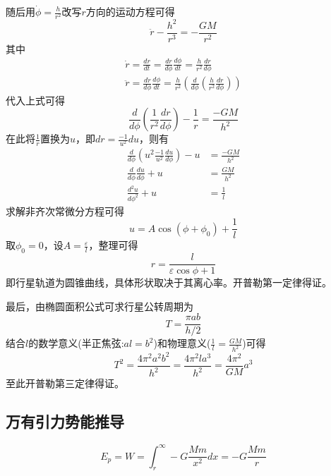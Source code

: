 随后用$\dot{\phi}=\frac{h}{r^2}$改写$r$方向的运动方程可得
\begin{equation*}
    \ddot{r}-\frac{h^2}{r^3}=-\frac{GM}{r^2}
\end{equation*}
其中
\begin{gather*}
    \dot{r}=\frac{dr}{dt}=\frac{dr}{d\phi}\frac{d\phi}{dt}=\frac{h}{r^2}\frac{dr}{d\phi}\\
    \ddot{r}=\frac{d\dot{r}}{d\phi}\frac{d\phi}{dt}=\frac{h}{r^2}\left(\frac{d}{d\phi}\left(\frac{h}{r^2}\frac{dr}{d\phi}\right)\right)
\end{gather*}
代入上式可得
\begin{equation*}
    \frac{d}{d\phi}\left(\frac{1}{r^2}\frac{dr}{d\phi}\right)-\frac1r=\frac{-GM}{h^2}
\end{equation*}
在此将$\frac1r$置换为$u$，即$dr=\frac{-1}{u^2}du$，则有
\begin{align*}
    \frac{d}{d\phi}\left(u^2\frac{-1}{u^2}\frac{du}{d\phi}\right)-u&=\frac{-GM}{h^2}\\
    \frac{d}{d\phi}\frac{du}{d\phi}+u&=\frac{GM}{h^2}\\
    \frac{d^2u}{d\phi^2}+u&=\frac1l
\end{align*}
求解非齐次常微分方程可得
\begin{equation*}
    u=A\cos(\phi+\phi_0)+\frac1l
\end{equation*}
取$\phi_0=0$，设$A=\frac{\varepsilon}{l}$，整理可得
\begin{equation*}
    r=\frac{l}{\varepsilon\cos\phi+1}
\end{equation*}
即行星轨道为圆锥曲线，具体形状取决于其离心率。开普勒第一定律得证。

最后，由椭圆面积公式可求行星公转周期为
\begin{equation*}
    T=\frac{\pi ab}{h/2}
\end{equation*}
结合$l$的数学意义(半正焦弦:$al=b^2$)和物理意义($\frac1l=\frac{GM}{h^2}$)可得
\begin{equation*}
    T^2=\frac{4\pi^2 a^2b^2}{h^2}
    =\frac{4\pi^2la^3}{h^2}
    =\frac{4\pi^2}{GM}a^3
\end{equation*}
至此开普勒第三定律得证。

\subsection{万有引力势能推导}

\begin{equation*}
    E_p=W=\int_r^\infty-G\frac{Mm}{x^2}dx=-G\frac{Mm}{r}
\end{equation*}

